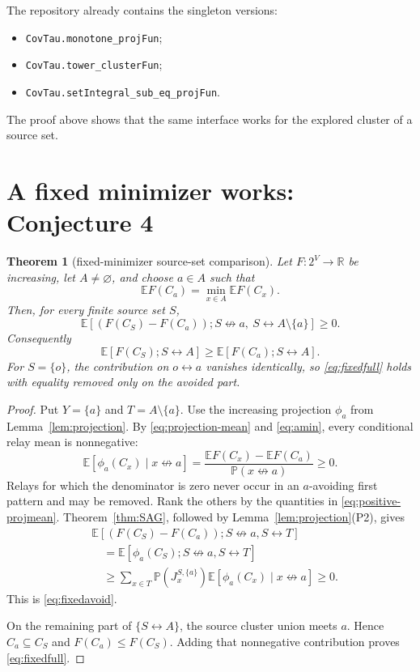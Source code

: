 \documentclass[11pt]{article}
\newtheorem{theorem}{Theorem}[section]
\theoremstyle{definition}
\theoremstyle{remark}
\newcommand{\PP}{\mathbb P}
\newcommand{\EE}{\mathbb E}
\newcommand{\con}{\leftrightarrow}
\newcommand{\ncon}{\not\leftrightarrow}
\newcommand{\lean}[1]{\texttt{#1}}
\begin{document}
The repository already contains the singleton versions:
\begin{itemize}[nosep]
\item \lean{CovTau.monotone\_projFun};
\item \lean{CovTau.tower\_clusterFun};
\item \lean{CovTau.setIntegral\_sub\_eq\_projFun}.
\end{itemize}
The proof above shows that the same interface works for the explored
cluster of a source set.

\section{A fixed minimizer works: Conjecture 4}\label{sec:C4}

\begin{theorem}[fixed-minimizer source-set comparison]\label{thm:fixedmin}
Let $F:2^V\to\mathbb R$ be increasing, let $A\ne\varnothing$, and choose
$a\in A$ such that
\begin{equation}\label{eq:amin}
 \EE F(C_a)=\min_{x\in A}\EE F(C_x).
\end{equation}
Then, for every finite source set $S$,
\begin{equation}\label{eq:fixedavoid}
 \EE[(F(C_S)-F(C_a));S\ncon a,\ S\con A\setminus\{a\}]
 \geq0.
\end{equation}
Consequently
\begin{equation}\label{eq:fixedfull}
 \EE[F(C_S);S\con A]\geq\EE[F(C_a);S\con A].
\end{equation}
For $S=\{o\}$, the contribution on $o\con a$ vanishes identically, so
\eqref{eq:fixedfull} holds with equality removed only on the avoided part.
\end{theorem}

\begin{proof}
Put $Y=\{a\}$ and $T=A\setminus\{a\}$.  Use the increasing projection
$\phi_a$ from Lemma~\ref{lem:projection}.  By
\eqref{eq:projection-mean} and \eqref{eq:amin}, every conditional relay
mean is nonnegative:
\begin{equation}\label{eq:positive-projmean}
 \EE[\phi_a(C_x)\mid x\ncon a]
 =\frac{\EE F(C_x)-\EE F(C_a)}{\PP(x\ncon a)}\geq0.
\end{equation}
Relays for which the denominator is zero never occur in an $a$-avoiding
first pattern and may be removed.  Rank the others by the quantities in
\eqref{eq:positive-projmean}.  Theorem~\ref{thm:SAG}, followed by
Lemma~\ref{lem:projection}\textup{(P2)}, gives
\begin{align*}
 &\EE[(F(C_S)-F(C_a));S\ncon a,S\con T]\\
 &\quad=\EE[\phi_a(C_S);S\ncon a,S\con T]\\
 &\quad\geq
 \sum_{x\in T}\PP(J_x^{S,\{a\}})
       \EE[\phi_a(C_x)\mid x\ncon a]\geq0.
\end{align*}
This is \eqref{eq:fixedavoid}.

On the remaining part of $\{S\con A\}$, the source cluster union meets
$a$.  Hence $C_a\subseteq C_S$ and $F(C_a)\leq F(C_S)$.  Adding that
nonnegative contribution proves \eqref{eq:fixedfull}.
\end{proof}
\end{document}
